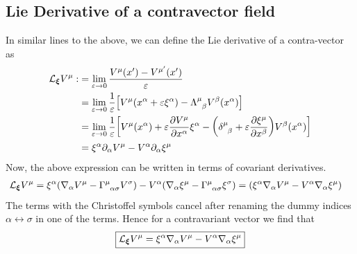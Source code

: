 \subsection{Lie Derivative of a contravector field}
In similar lines to the above, we can define the Lie derivative of a contra-vector as
\begin{align*}
    \SL_{\boldsymbol{\xi}} V^\mu :&= \lim\limits_{\varepsilon\to 0} \frac{V^\mu(x')-V^{\mu'}(x')}{\varepsilon}\\
    &=\lim\limits_{\varepsilon\to 0}\frac{1}{\varepsilon}\qty[V^\mu(x^\alpha + \varepsilon \xi^\alpha)-\trmat{\mu}{\beta}V^\beta(x^\alpha)]\\
    &=\lim\limits_{\varepsilon\to 0}\frac{1}{\varepsilon}\qty[V^\mu(x^\alpha) + \varepsilon \pdv{V^\mu}{{x^\alpha}} \xi^\alpha-\qty(\tensor{\delta}{^\mu _\beta} +\varepsilon \pdv{\xi^\mu}{{x^\beta}})V^\beta(x^\alpha)]\\
    &=\xi^\alpha\partial_\alpha V^\mu -V^\alpha \partial_\alpha \xi^\mu 
\end{align*}
Now, the above expression can be written in terms of covariant derivatives.
\begin{align*}
    \SL_{\boldsymbol{\xi}} V^\mu &=\xi^\alpha\qty(\covd{\alpha}V^\mu - \chris{\mu}{\alpha}{\sigma}V^\sigma) -V^\alpha \qty(\covd{\alpha}\xi^\mu -\chris{\mu}{\alpha}{\sigma}\xi^\sigma ) = \qty(\xi^\alpha\covd{\alpha}V^\mu -V^\alpha\covd{\alpha}\xi^\mu)
\end{align*}
The terms with the Christoffel symbols cancel after renaming the dummy indices $\alpha \leftrightarrow \sigma$ in one of the terms. Hence for a contravariant vector we find that 
$$\boxed{\mathcal L_{\boldsymbol{\xi}} V^\mu = \xi^\alpha\nabla_{\alpha} V^\mu -V^\alpha \nabla_{\alpha} \xi^\mu}$$ 
